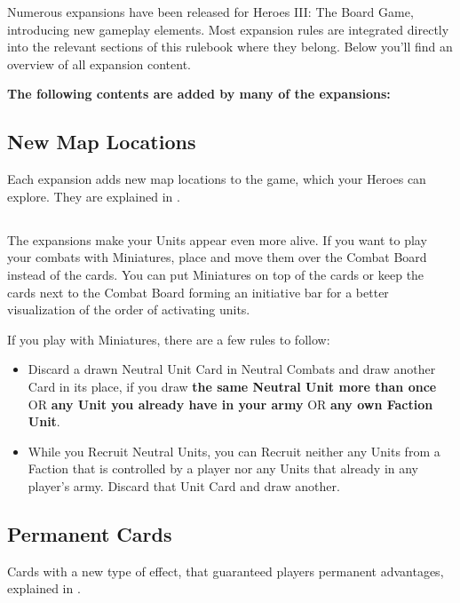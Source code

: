 
Numerous expansions have been released for Heroes III: The Board Game, introducing new gameplay elements.
Most expansion rules are integrated directly into the relevant sections of this rulebook where they belong.
Below you'll find an overview of all expansion content.

\vspace*{1em}

\textbf{The following contents are added by many of the expansions:}
\begin{multicols*}{2}
\subsection*{New Map Locations}
Each expansion adds new map locations to the game, which your Heroes can explore.
They are explained in .

\subsection*{}
The expansions make your Units appear even more alive.
If you want to play your combats with Miniatures, place and move them over the Combat Board instead of the cards.
You can put Miniatures on top of the cards or keep the cards next to the Combat Board forming an initiative bar for a better visualization of the order of activating units.\par
\vspace*{1em}
If you play with Miniatures, there are a few rules to follow:
\begin{itemize}
  \item Discard a drawn Neutral Unit Card in Neutral Combats and draw another Card in its place, if you draw \textbf{the same Neutral Unit more than once} OR \textbf{any Unit you already have in your army} OR \textbf{any own Faction Unit}.
  \item While you Recruit Neutral Units, you can Recruit neither any Units from a Faction that is controlled by a player nor any Units that already in any player's army.
  Discard that Unit Card and draw another.
\end{itemize}

\subsection*{Permanent Cards}
Cards with a new type of effect, that guaranteed players permanent advantages, explained in .


\end{multicols*}

